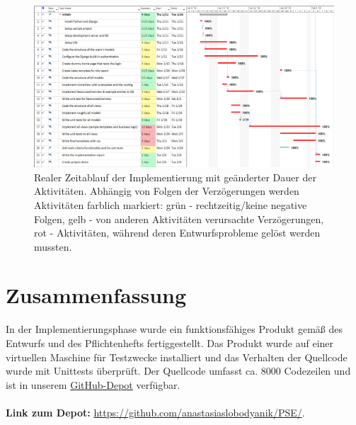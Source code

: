 \documentclass[parskip=full,11pt]{scrartcl}
\begin{document}
 \newpage
  \begin{figure}[h]
 	\centering
 	\includegraphics[width=1\textwidth]{res/gannt_real.png}
 	\caption{Realer Zeitablauf der Implementierung mit geänderter Dauer der Aktivitäten. Abhängig von Folgen der Verzögerungen werden Aktivitäten farblich markiert: grün - rechtzeitig/keine negative Folgen, gelb - von anderen Aktivitäten verursachte Verzögerungen, rot - Aktivitäten, während deren Entwurfsprobleme gelöst werden mussten.}
 	\label{ganntnew}
 \end{figure}
 
 
\section{Zusammenfassung}
In der Implementierungsphase wurde ein funktionsfähiges Produkt gemäß des Entwurfs und des Pflichtenhefts fertiggestellt. Das Produkt wurde auf einer virtuellen Maschine für Testzwecke installiert und das Verhalten der Quellcode wurde mit Unittests überprüft. Der Quellcode umfasst ca. 8000  Codezeilen und ist in unserem \href{https://github.com/anastasiaslobodyanik/PSE/}{GitHub-Depot} verfügbar.\\\\
\textbf{Link zum Depot:} \href{https://github.com/anastasiaslobodyanik/PSE/}{https://github.com/anastasiaslobodyanik/PSE/}.
\end{document}
